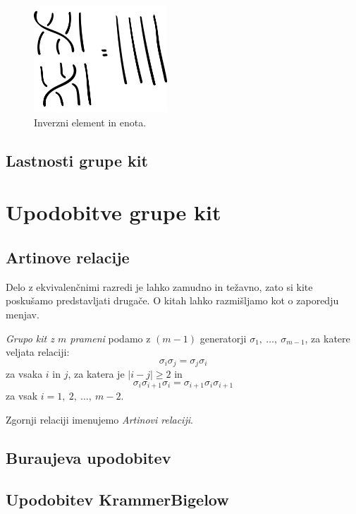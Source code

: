 \documentclass[mat1]{fmfdelo}
\begin{document}
\begin{figure}[ht!]
\includegraphics[height=4cm]{Inverz_1}
\caption{Inverzni element in enota.}
\end{figure}


\subsection{Lastnosti grupe kit}


\section{Upodobitve grupe kit}

\subsection{Artinove relacije}

Delo z ekvivalenčnimi razredi je lahko zamudno in težavno, zato si kite poskušamo predstavljati drugače. O kitah lahko razmišljamo kot o zaporedju menjav. 

\begin{definicija}
\emph{Grupo kit z $m$ prameni} podamo z $(m - 1)$ generatorji $\sigma_1,\ \ldots ,\ \sigma_{m - 1}$, za katere veljata relaciji: $$ \sigma_i \sigma_j = \sigma_j \sigma_i $$ za vsaka $i$ in $j$, za katera je $|i - j| \geq 2$ in $$\sigma_i \sigma_{i+1} \sigma_i = \sigma_{i+1} \sigma_i \sigma_{i+1}$$ za vsak $i = 1,\ 2,\ \ldots,\ m-2$.
\end{definicija}

\begin{opomba}
Zgornji relaciji imenujemo \emph{Artinovi relaciji}.
\end{opomba}

\subsection{Buraujeva upodobitev}

\subsection{Upodobitev Krammer\-Bigelow}
\end{document}
